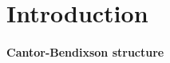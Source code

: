 \documentclass{article}
\begin{document}

\tableofcontents

\section{Introduction}

\paragraph{Cantor-Bendixson structure}
\end{document}
